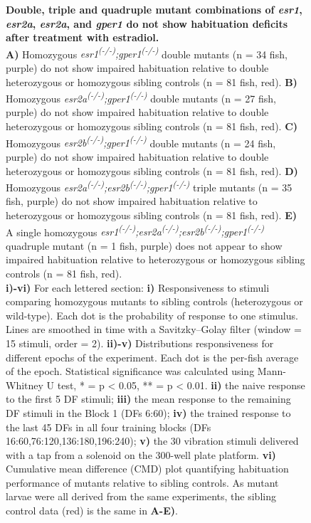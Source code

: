 \documentclass[9.5pt,lineno]{RandlettLab_elife}
\begin{document}
{\begin{figure}
\begin{fullwidth}
\begin{center}
\caption{ \textbf{Double, triple and quadruple mutant combinations of \emph{esr1}, \emph{esr2a}, \emph{esr2a}, and \emph{gper1} do not show habituation deficits after treatment with estradiol.} \scriptsize
\\ \textbf{A)} Homozygous \emph{esr1\textsuperscript{(-/-)};gper1\textsuperscript{(-/-)}} double mutants (n = 34 fish, purple) do not show impaired habituation relative to double heterozygous or homozygous sibling controls (n = 81 fish, red). 
\textbf{B)} Homozygous \emph{esr2a\textsuperscript{(-/-)};gper1\textsuperscript{(-/-)}} double mutants (n = 27 fish, purple) do not show impaired habituation relative to double heterozygous or homozygous sibling controls (n = 81 fish, red). 
\textbf{C)} Homozygous \emph{esr2b\textsuperscript{(-/-)};gper1\textsuperscript{(-/-)}} double mutants (n = 24 fish, purple) do not show impaired habituation relative to double heterozygous or homozygous sibling controls (n = 81 fish, red). 
\textbf{D)} Homozygous \emph{esr2a\textsuperscript{(-/-)};esr2b\textsuperscript{(-/-)};gper1\textsuperscript{(-/-)}} triple mutants (n = 35 fish, purple) do not show impaired habituation relative to heterozygous or homozygous sibling controls (n = 81 fish, red). 
\textbf{E)} A single homozygous \emph{esr1\textsuperscript{(-/-)};esr2a\textsuperscript{(-/-)};esr2b\textsuperscript{(-/-)};gper1\textsuperscript{(-/-)}} quadruple mutant (n = 1 fish, purple) does not appear to show impaired habituation relative to heterozygous or homozygous sibling controls (n = 81 fish, red). 
\\ \textbf{i)-vi)} For each lettered section: 
\textbf{i)} Responsiveness to stimuli comparing homozygous mutants to sibling controls (heterozygous or wild-type). 
Each dot is the probability of response to one stimulus. Lines are smoothed in time with a Savitzky–Golay filter (window = 15 stimuli, order = 2).
\textbf{ii)-v)} Distributions responsiveness for different epochs of the experiment. Each dot is the per-fish average of the epoch. 
Statistical significance was calculated using Mann-Whitney U test, * = p < 0.05, ** = p < 0.01.
\textbf{ii)} the naive response to the first 5 DF stimuli; \textbf{iii)} the mean response to the remaining DF stimuli in the Block 1 (DFs 6:60); \textbf{iv)} the trained response to the last 45 DFs in all four training blocks (DFs 16:60,76:120,136:180,196:240); \textbf{v)} the 30 vibration stimuli delivered with a tap from a solenoid on the 300-well plate platform.
\textbf{vi)} Cumulative mean difference (CMD) plot quantifying habituation performance of mutants relative to sibling controls. 
As mutant larvae were all derived from the same experiments, the sibling control data (red) is the same in \textbf{A-E)}.
}


\end{center}
\end{fullwidth}
\end{figure}}
\end{document}
